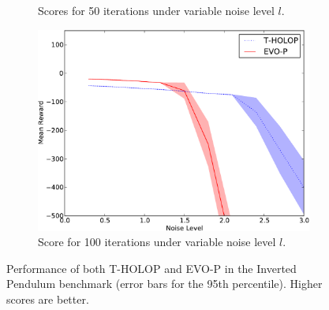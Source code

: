 \documentclass[conference]{IEEEtran}
\begin{document}
\begin{figure}[ht]
\begin{subfigure}[b]{0.32\textwidth}
                \caption{Scores for 50 iterations under variable noise level $l$.}
                \label{fig:IP-N-50}
        \end{subfigure}  \begin{subfigure}[b]{0.32\textwidth}
                \centering
                \includegraphics[width=1.0\textwidth]{graphics/online-noise-IP_100-crop.pdf}
                \caption{Score for 100 iterations under variable noise level $l$.}
                \label{fig:IP-N-100}
        \end{subfigure}%

         \caption{Performance of both T-HOLOP and EVO-P in the Inverted Pendulum benchmark (error bars for the 95th percentile). Higher scores are better.}
         \label{fig:IP-all}

\end{figure}
\end{document}

